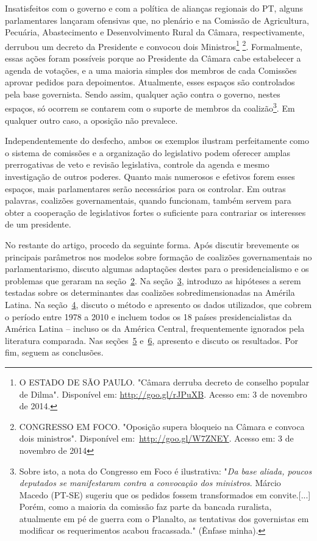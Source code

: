 Insatisfeitos com o governo e com a política de alianças regionais do PT, alguns parlamentares lançaram ofensivas que, no plenário e na Comissão de Agricultura, Pecuária, Abastecimento e Desenvolvimento Rural da Câmara, respectivamente, derrubou um decreto da Presidente e convocou dois Ministros\footnote{O ESTADO DE SÃO PAULO. "Câmara derruba decreto de conselho popular de Dilma". Disponível em: \url{http://goo.gl/rJPuXB}. Acesso em: 3 de novembro de 2014.} \footnote{CONGRESSO EM FOCO. "Oposição supera bloqueio na Câmara e convoca dois ministros". Disponível em:~\url{http://goo.gl/W7ZNEY}. Acesso em: 3 de novembro de 2014}. Formalmente, essas ações foram possíveis porque ao Presidente da Câmara cabe estabelecer a agenda de votações, e a uma maioria simples dos membros de cada Comissões aprovar pedidos para depoimentos. Atualmente, esses espaços são controlados pela base governista. Sendo assim, qualquer ação contra o governo, nestes espaços, só ocorrem se contarem com o suporte de membros da coalizão\footnote{Sobre isto, a nota do Congresso em Foco é ilustrativa: "\textit{Da base aliada, poucos deputados se manifestaram contra a convocação dos ministros}. Márcio Macedo (PT-SE) sugeriu que os pedidos fossem transformados em convite.[...] Porém, como a maioria da comissão faz parte da bancada ruralista, atualmente em pé de guerra com o Planalto, as tentativas dos governistas em modificar os requerimentos acabou fracassada." (Ênfase minha).}. Em qualquer outro caso, a oposição não prevalece.

Independentemente do desfecho, ambos os exemplos ilustram perfeitamente como o sistema de comissões e a organização do legislativo podem oferecer amplas prerrogativas de veto e revisão legislativa, controle da agenda e mesmo investigação de outros poderes. Quanto mais numerosos e efetivos forem esses espaços, mais parlamentares serão necessários para os controlar. Em outras palavras, coalizões governamentais, quando funcionam, também servem para obter a cooperação de legislativos fortes o suficiente para contrariar os interesses de um presidente.

No restante do artigo, procedo da seguinte forma. Após discutir brevemente os principais parâmetros nos modelos sobre formação de coalizões governamentais no parlamentarismo, discuto algumas adaptações destes para o presidencialismo e os problemas que geraram na seção~\hyperref[sec:revisao]{2}. Na seção~\hyperref[sec:FAZER]{3}, introduzo as hipóteses a serem testadas sobre os determinantes das coalizões sobredimensionadas na Amérila Latina. Na seção~\hyperref[sec:FAZER]{4}, discuto o método e apresento os dados utilizados, que cobrem o período entre 1978 a 2010 e incluem todos os 18 países presidencialistas da América Latina -- incluso os da América Central, frequentemente ignorados pela literatura comparada. Nas seções~\hyperref[sec:FAZER]{5} e~\hyperref[sec:FAZER]{6}, apresento e discuto os resultados. Por fim, seguem as conclusões.
